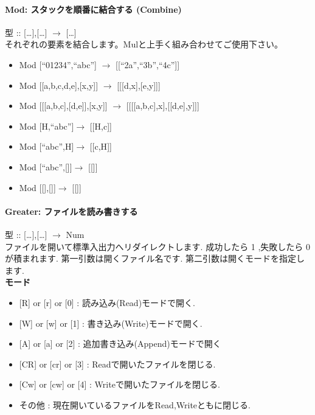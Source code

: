 \paragraph{Mod: スタックを順番に結合する (Combine)}

型 :: {[}\ldots{}{]},{[}\ldots{}{]} $\to$
{[}\ldots{}{]}\\それぞれの要素を結合します。Mulと上手く組み合わせてご使用下さい。

\begin{itemize}
\item
  Mod {[}``01234'',``abc''{]} $\to$
  {[}{[}``2a'',``3b'',``4c''{]}{]}
\item
  Mod {[}{[}a,b,c,d,e{]},{[}x,y{]}{]} $\to$
  {[}{[}{[}d,x{]},{[}e,y{]}{]}{]}
\item
  Mod {[}{[}{[}a,b,c{]},{[}d,e{]}{]},{[}x,y{]}{]} $\to$
  {[}{[}{[}{[}a,b,c{]},x{]},{[}{[}d,e{]},y{]}{]}{]}
\item
  Mod {[}H,``abc''{]}$\to$ {[}{[}H,c{]}{]}
\item
  Mod {[}``abc'',H{]}$\to$ {[}{[}c,H{]}{]}
\item
  Mod {[}``abc'',{[}{]}{]}$\to$ {[}{[}{]}{]}
\item
  Mod {[}{[}{]},{[}{]}{]}$\to$ {[}{[}{]}{]}
\end{itemize}

\paragraph{Greater: ファイルを読み書きする}

型 :: {[}\ldots{}{]},{[}\ldots{}{]} $\to$
Num\\ファイルを開いて標準入出力へリダイレクトします. 成功したら 1
,失敗したら 0 が積まれます. 第一引数は開くファイル名です.
第二引数は開くモードを指定します.\\\textbf{モード}

\begin{itemize}
\item
  {[}R{]} or {[}r{]} or {[}0{]} : 読み込み(Read)モードで開く.
\item
  {[}W{]} or {[}w{]} or {[}1{]} : 書き込み(Write)モードで開く.
\item
  {[}A{]} or {[}a{]} or {[}2{]} : 追加書き込み(Append)モードで開く
\item
  {[}CR{]} or {[}cr{]} or {[}3{]} : Readで開いたファイルを閉じる.
\item
  {[}Cw{]} or {[}cw{]} or {[}4{]} : Writeで開いたファイルを閉じる.
\item
  その他 : 現在開いているファイルをRead,Writeともに閉じる.
\end{itemize}

